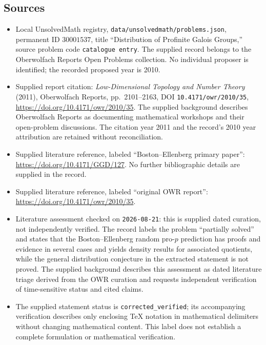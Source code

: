 \documentclass[11pt]{article}
\begin{document}
\subsection{Sources}
\begin{itemize}
\item Local UnsolvedMath registry, \texttt{data/unsolvedmath/problems.json}, permanent ID $30001537$, title ``Distribution of Profinite Galois Groups,'' source problem code \texttt{catalogue entry}. The supplied record belongs to the Oberwolfach Reports Open Problems collection. No individual proposer is identified; the recorded proposed year is 2010.
\item Supplied report citation: \emph{Low-Dimensional Topology and Number Theory} (2011), Oberwolfach Reports, pp.~2101--2163, DOI \texttt{10.4171/owr/2010/35}, \url{https://doi.org/10.4171/owr/2010/35}. The supplied background describes Oberwolfach Reports as documenting mathematical workshops and their open-problem discussions. The citation year 2011 and the record's 2010 year attribution are retained without reconciliation.
\item Supplied literature reference, labeled ``Boston--Ellenberg primary paper'': \url{https://doi.org/10.4171/GGD/127}. No further bibliographic details are supplied in the record.
\item Supplied literature reference, labeled ``original OWR report'': \url{https://doi.org/10.4171/owr/2010/35}.
\item Literature assessment checked on \texttt{2026-08-21}: this is supplied dated curation, not independently verified. The record labels the problem ``partially solved'' and states that the Boston--Ellenberg random pro-$p$ prediction has proofs and evidence in several cases and yields density results for associated quotients, while the general distribution conjecture in the extracted statement is not proved. The supplied background describes this assessment as dated literature triage derived from the OWR curation and requests independent verification of time-sensitive status and cited claims.
\item The supplied statement status is \texttt{corrected\_verified}; its accompanying verification describes only enclosing TeX notation in mathematical delimiters without changing mathematical content. This label does not establish a complete formulation or mathematical verification.
\end{itemize}
\end{document}
